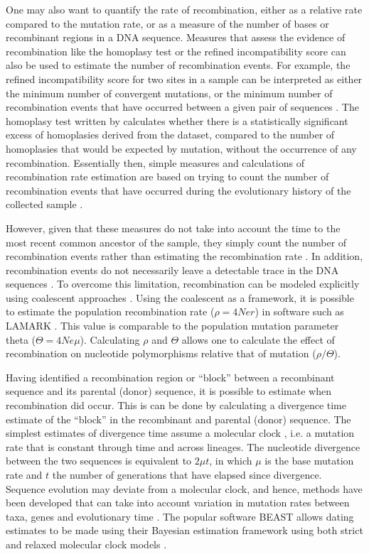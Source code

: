 One may also want to quantify the rate of recombination, either as a relative rate compared to the mutation rate, or as a measure of the number of bases or recombinant regions in a DNA sequence. Measures that assess the evidence of recombination like the homoplasy test or the refined incompatibility score \parencite{Bruen2006,MaynardSmith1998} can also be used to estimate the number of recombination events. For example, the refined incompatibility score for two sites in a sample can be interpreted as either the minimum number of convergent mutations, or the minimum number of recombination events that have occurred between a given pair of sequences \parencite{Bruen2006}. The homoplasy test written by \cite{MaynardSmith1998} calculates whether there is a statistically significant excess of homoplasies derived from the dataset, compared to the number of homoplasies that would be expected by mutation, without the occurrence of any recombination. Essentially then, simple measures and calculations of recombination rate estimation are based on trying to count the number of recombination events that have occurred during the evolutionary history of the collected sample \parencite{Stumpf2003}.

However, given that these measures do not take into account the time to the most recent common ancestor of the sample, they simply count the number of recombination events rather than estimating the recombination rate \parencite{Posada2002}. In addition, recombination events do not necessarily leave a detectable trace in the DNA sequences \parencite{Lemey2009b}. To overcome this limitation, recombination can be modeled explicitly using coalescent approaches \parencite{Stumpf2003}. Using the coalescent as a framework, it is possible to estimate the population recombination rate ($\rho = 4Ner$) in software such as LAMARK \parencite{Hudson1988,Hudson2001,Kuhner2006a}. This value is comparable to the population mutation parameter theta ($\Theta = 4Ne\mu$). Calculating $\rho$ and $\Theta$ allows one to calculate the effect of recombination on nucleotide polymorphisms relative that of mutation ($\rho/\Theta$).

Having identified a recombination region or “block” between a recombinant sequence and its parental (donor) sequence, it is possible to estimate when recombination did occur. This is can be done by calculating a divergence time estimate of the “block” in the recombinant and parental (donor) sequence. The simplest estimates of divergence time assume a molecular clock \parencite{Li2008MolecularClocks,Metzgar2007MutationEvolution}, i.e. a mutation rate that is constant through time and across lineages. The nucleotide divergence between the two sequences is equivalent to $2\mu t$, in which $\mu$ is the base mutation rate and $t$ the number of generations that have elapsed since divergence.  Sequence evolution may deviate from a molecular clock, and hence, methods have been developed that can take into account variation in mutation rates between taxa, genes and evolutionary time \parencite{Brown2011,Drummond2012,Drummond2010,Thorne1998}. The popular software BEAST allows dating estimates to be made using their Bayesian estimation framework using both strict and relaxed molecular clock models \parencite{Bouckaert2014BEASTAnalysis}.

